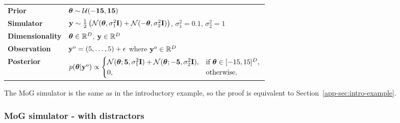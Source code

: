 \begin{tabular}{@{}ll@{}}
  \textbf{Prior} & $\boldsymbol{\theta} \sim \mathcal{U}(-\mathbf{15}, \mathbf{15})$ \\ [5pt]
  \textbf{Simulator} & $\mathbf{y} \sim \frac{1}{2} \left( \mathcal{N}(\boldsymbol{\theta}, \sigma_1^2\mathbf{I}) + \mathcal{N}(-\boldsymbol{\theta}, \sigma_2^2\mathbf{I}) \right)$, $\sigma_1^2=0.1$, $\sigma_2^2=1$ \\ [5pt]
  \textbf{Dimensionality} & $\boldsymbol{\theta} \in \mathbb{R}^{D}$, $\mathbf{y} \in \mathbb{R}^{D}$ \\ [5pt]
  \textbf{Observation} & $\mathbf{y}^o = (5, \ldots, 5) + \epsilon$ where $\mathbf{y}^o \in \mathbb{R}^D$ \\ [5pt]
  \textbf{Posterior} & $ p(\boldsymbol{\theta} | \mathbf{y}^o) \propto
                                    \begin{cases}
                                      \mathcal{N}(\boldsymbol{\theta}; \mathbf{5}, \sigma_1^2 \mathbf{I}) + \mathcal{N}(\boldsymbol{\theta}; -\mathbf{5}, \sigma_2^2 \mathbf{I}), & \text{if } \boldsymbol{\theta} \in [-15, 15]^D, \\
                                      0, & \text{otherwise}.
                                    \end{cases} $ \\ [5pt]
\end{tabular}

The MoG simulator is the same as in the introductory example, so the proof is equivalent to Section~\ref{app-sec:intro-example}.

\subsubsection{MoG simulator - with distractors}

